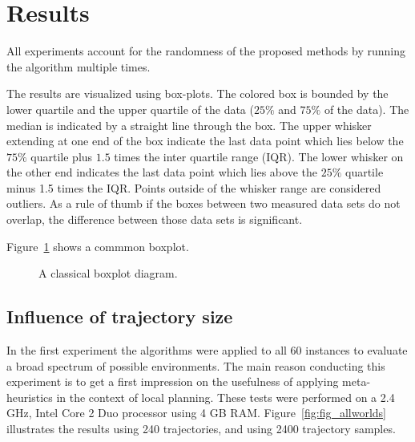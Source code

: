 \section{Results}\label{sec:testresults}

All experiments account for the randomness of the proposed methods by running the algorithm multiple times.

The results are visualized using box-plots. 
The colored box is bounded by the lower quartile and the upper quartile of the data ($25\%$ and $75\%$ of the data). 
The median is indicated by a straight line through the box. 
The upper whisker extending at one end of the box indicate the last data point which lies below the $75\%$ quartile plus $1.5$ times the
inter quartile range (IQR). The lower whisker on the other end indicates the last data point which lies above the $25\%$ quartile minus 1.5 times the IQR. 
Points outside of the whisker range are considered outliers.
As a rule of thumb if the boxes between two measured data sets do not overlap, the difference between those data sets is significant.

Figure~\ref{fig:fig_boxplot} shows a commmon boxplot. 
\begin{figure}[thpb]
     \footnotesize
      \centering
      \myfloatalign
      \setlength\fboxsep{0pt}
      \setlength\fboxrule{0.5pt}
       \caption{A classical boxplot diagram.}
      \label{fig:fig_boxplot}
   \end{figure}

\subsection{Influence of trajectory size}
In the first experiment the algorithms were applied to all 60 instances to evaluate a broad spectrum of possible environments. 
The main reason conducting this experiment is to get a first impression on the usefulness of applying meta-heuristics in the context of local planning. 
These tests were performed on a 2.4 GHz, Intel Core 2 Duo processor using 4 GB RAM.  
Figure~\ref{fig:fig_allworlds} illustrates the results using 240 trajectories, and using 2400 trajectory samples.


